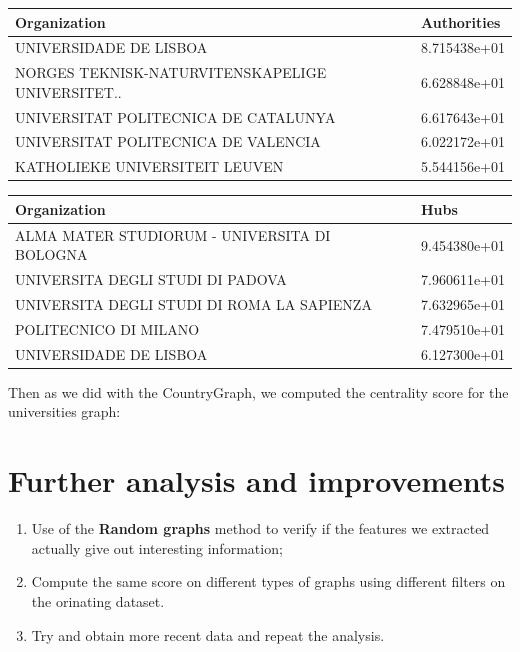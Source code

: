     \begin{table}[hbtp]
        \parbox{.25\linewidth}{
        \centering
        \begin{tabular}{l l}
            \hline
            \textbf{Organization} & \textbf{Authorities} \\ \hline
            UNIVERSIDADE DE LISBOA & 8.715438e+01 \\
            NORGES TEKNISK-NATURVITENSKAPELIGE UNIVERSITET.. & 6.628848e+01 \\
            UNIVERSITAT POLITECNICA DE CATALUNYA & 6.617643e+01 \\
            UNIVERSITAT POLITECNICA DE VALENCIA & 6.022172e+01 \\
            KATHOLIEKE UNIVERSITEIT LEUVEN & 5.544156e+01 \\ \hline
          \end{tabular}
          \label{tab:table-label}
        }
        \end{table}
        \begin{table}[H]
        \parbox{.25\linewidth}{
        \centering
        \begin{tabular}{l l}
            \hline
            \textbf{Organization} & \textbf{Hubs} \\ \hline
            ALMA MATER STUDIORUM - UNIVERSITA DI BOLOGNA & 9.454380e+01 \\
            UNIVERSITA DEGLI STUDI DI PADOVA & 7.960611e+01 \\
            UNIVERSITA DEGLI STUDI DI ROMA LA SAPIENZA & 7.632965e+01 \\
            POLITECNICO DI MILANO & 7.479510e+01 \\
            UNIVERSIDADE DE LISBOA & 6.127300e+01 \\ \hline
          \end{tabular}
          \label{tab:table-label}
        }
        \end{table}
    
        Then as we did with the CountryGraph, we computed the centrality score for the universities graph:

    \section{Further analysis and improvements}
    \begin{enumerate}
        \item Use of the \textbf{Random graphs} method to verify if the features we extracted actually give out interesting information;
        \item Compute the same score on different types of graphs using different filters on the orinating dataset. 
        \item Try and obtain more recent data and repeat the analysis.
    \end{enumerate} 
  

